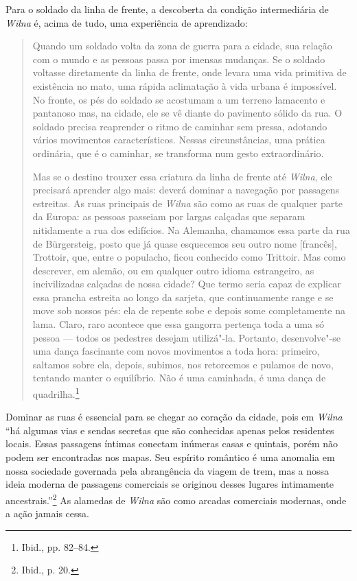 %

Para o soldado da linha de frente, a descoberta da condição
intermediária de \textit{Wilna} é, acima de tudo, uma experiência de aprendizado:

\begin{quote}
Quando um soldado volta da zona de guerra para a cidade, sua relação com
o mundo e as pessoas passa por imensas mudanças. Se o soldado voltasse
diretamente da linha de frente, onde levara uma vida primitiva de
existência no mato, uma rápida aclimatação à vida urbana é impossível.
No fronte, os pés do soldado se acostumam a um terreno lamacento e
pantanoso mas, na cidade, ele se vê diante do pavimento sólido da rua. O
soldado precisa reaprender o ritmo de caminhar sem pressa, adotando
vários movimentos característicos. Nessas circunstâncias, uma prática
ordinária, que é o caminhar, se transforma num gesto extraordinário.

Mas se o destino trouxer essa criatura da linha de frente até \textit{Wilna}, ele
precisará aprender algo mais: deverá dominar a navegação por passagens
estreitas. As ruas principais de \textit{Wilna} são como as ruas de qualquer
parte da Europa: as pessoas passeiam por largas calçadas que separam
nitidamente a rua dos edifícios. Na Alemanha, chamamos essa parte da rua
de Bürgersteig, posto que já quase esquecemos seu outro nome
{[}francês{]}, Trottoir, que, entre o populacho, ficou conhecido como
Trittoir. Mas como descrever, em alemão, ou em qualquer outro idioma
estrangeiro, as incivilizadas calçadas de nossa cidade? Que termo seria
capaz de explicar essa prancha estreita ao longo da sarjeta, que
continuamente range e se move sob nossos pés: ela de repente sobe e
depois some completamente na lama. Claro, raro acontece que essa
gangorra pertença toda a uma só pessoa --- todos os pedestres desejam
utilizá"-la. Portanto, desenvolve"-se uma dança fascinante com novos
movimentos a toda hora: primeiro, saltamos sobre ela, depois, subimos,
nos retorcemos e pulamos de novo, tentando manter o equilíbrio. Não é
uma caminhada, é uma dança de quadrilha.\footnote{Ibid., pp. 82--84.}
\end{quote}


Dominar as ruas é essencial para se chegar ao coração da cidade, pois em
\textit{Wilna} ``há algumas vias e sendas secretas que são conhecidas apenas
pelos residentes locais. Essas passagens íntimas conectam inúmeras casas
e quintais, porém não podem ser encontradas nos mapas. Seu espírito
romântico é uma anomalia em nossa sociedade governada pela abrangência
da viagem de trem, mas a nossa ideia moderna de passagens comerciais se
originou desses lugares intimamente ancestrais.''\footnote{Ibid., p. 20.}
As alamedas de \textit{Wilna} são como arcadas comerciais modernas, onde a ação
jamais cessa.

